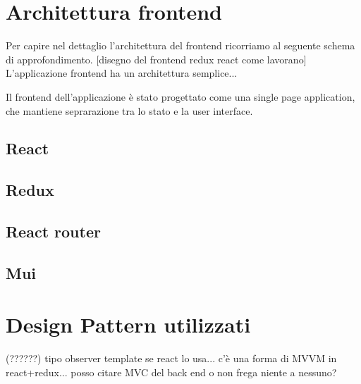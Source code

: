 \section{Architettura frontend}
Per capire nel dettaglio l'architettura del frontend ricorriamo al seguente schema di approfondimento.
  [disegno del frontend redux react come lavorano]
L'applicazione frontend ha un architettura semplice...


Il frontend dell'applicazione è stato progettato come una single page application, che mantiene seprarazione tra lo stato e la
user interface.
\subsection*{React}
\subsection*{Redux}
\subsection*{React router}
\subsection*{Mui}

\section{Design Pattern utilizzati}
 (??????) tipo observer template se react lo usa... c'è una forma di MVVM in react+redux... posso citare MVC del back end o non frega niente a nessuno?

